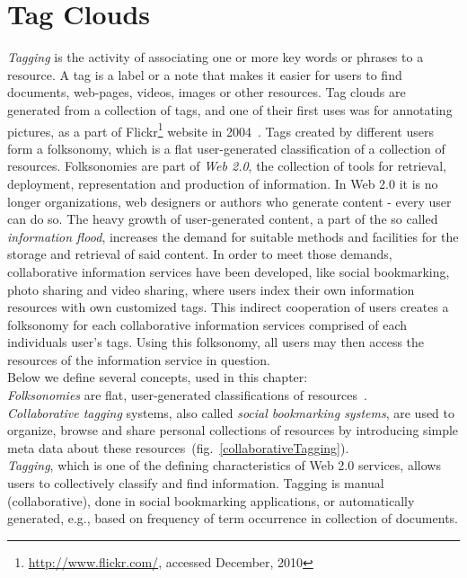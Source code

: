 \chapter{Tag Clouds}
\label{sec:tagclouds}

\textit{Tagging} is the activity of associating one or more key words or phrases to a resource. A tag is a label or a note that makes it easier for users to find documents, web-pages, videos, images or other resources. Tag clouds are generated from a collection of tags, and one of their first uses was for annotating pictures, as a part of Flickr\footnote{\url{http://www.flickr.com/}, accessed December, 2010} website in 2004~\cite{folksonomiesWeb2.0_2009}. Tags created by different users form a folksonomy, which is a flat user-generated classification of a collection of resources. Folksonomies are part of \textit{Web 2.0}, the collection of tools for retrieval, deployment, representation and production of information. In Web 2.0 it is no longer organizations, web designers or authors who generate content - every user can do so. The heavy growth of user-generated content, a part of the so called \textit{information flood}, increases the demand for suitable methods and facilities for the storage and retrieval of said content. In order to meet those demands, collaborative information services have been developed, like social bookmarking, photo sharing and video sharing, where users index their own information resources with own customized tags. This indirect cooperation of users creates a folksonomy for each collaborative information services comprised of each individuals user's tags. Using this folksonomy, all users may then access the resources of the information service in question. \\ 

Below we define several concepts, used in this chapter:\\

\textit{Folksonomies} are flat, user-generated classifications of resources~\cite{folksonomiesWeb2.0_2009}. \\

\textit{Collaborative tagging} systems, also called \textit{social bookmarking systems}, are used to organize, browse and share personal collections of resources by introducing simple meta data about these resources~(fig.~\ref{collaborativeTagging}). \\

\textit{Tagging}, which is one of the defining characteristics of Web 2.0 services, allows users to collectively classify and find information. Tagging is manual (collaborative), done in social bookmarking applications, or automatically generated, e.g., based on frequency of term occurrence in collection of documents.\\

